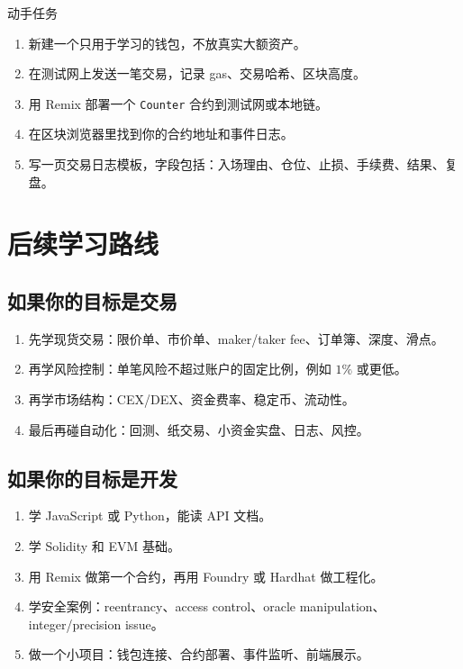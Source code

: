 \documentclass[UTF8,11pt]{ctexart}
\begin{document}
\begin{practicebox}{动手任务}
\begin{enumerate}
  \item 新建一个只用于学习的钱包，不放真实大额资产。
  \item 在测试网上发送一笔交易，记录 gas、交易哈希、区块高度。
  \item 用 Remix 部署一个 \texttt{Counter} 合约到测试网或本地链。
  \item 在区块浏览器里找到你的合约地址和事件日志。
  \item 写一页交易日志模板，字段包括：入场理由、仓位、止损、手续费、结果、复盘。
\end{enumerate}
\end{practicebox}

\section{后续学习路线}

\subsection{如果你的目标是交易}

\begin{enumerate}
  \item 先学现货交易：限价单、市价单、maker/taker fee、订单簿、深度、滑点。
  \item 再学风险控制：单笔风险不超过账户的固定比例，例如 \(1\%\) 或更低。
  \item 再学市场结构：CEX/DEX、资金费率、稳定币、流动性。
  \item 最后再碰自动化：回测、纸交易、小资金实盘、日志、风控。
\end{enumerate}

\subsection{如果你的目标是开发}

\begin{enumerate}
  \item 学 JavaScript 或 Python，能读 API 文档。
  \item 学 Solidity 和 EVM 基础。
  \item 用 Remix 做第一个合约，再用 Foundry 或 Hardhat 做工程化。
  \item 学安全案例：reentrancy、access control、oracle manipulation、integer/precision issue。
  \item 做一个小项目：钱包连接、合约部署、事件监听、前端展示。
\end{enumerate}
\end{document}
